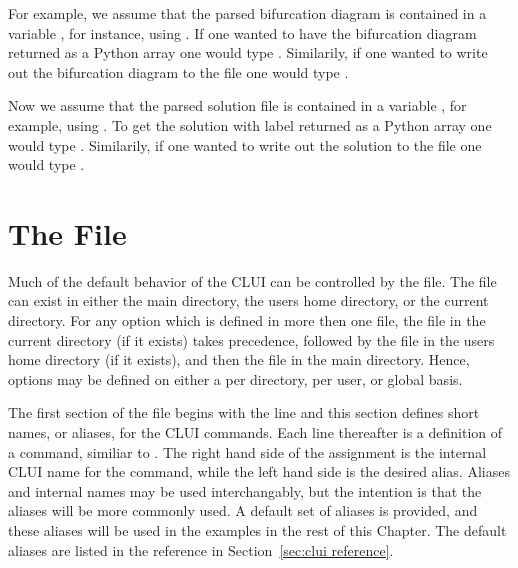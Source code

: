 \documentclass[12pt]{report}
\begin{document}
 For example, we assume
 that the parsed bifurcation diagram is contained in a variable
 , for instance, using .  If
 one wanted to have the bifurcation diagram returned as a Python array
 one would type .  Similarily, if one wanted
 to write out the bifurcation diagram to the file 
 one would type .

 Now we assume that the parsed solution file is contained
 in a variable , for example, using .
 To get the solution with label  returned as a Python
 array one would type .
 Similarily, if one wanted to write out the solution
 to the file  one would type
 .

 \section{ The  File }

 Much of the default behavior of the \AUTO CLUI
 can be controlled by the  file.
 The  file can exist in
 either the main \AUTO directory, the users
 home directory, or the current directory.  For any
 option which is defined in more then one file, 
 the  file
 in the current directory (if it exists) takes precedence, 
 followed by the  file
 in the users home directory (if it exists), and then the
  file in the main \AUTO directory.  Hence, 
 options may be defined on either a per directory, per
 user, or global basis.  

 The first section of the  file
 begins with the line 
 and this section defines short names, or aliases,
 for the \AUTO CLUI commands.  
 Each line thereafter is a definition of
 a command, similiar to 
 .
 The right hand side of the assignment
 is the internal \AUTO CLUI name for the command,
 while the left hand side is the desired alias.  
 Aliases and
 internal names may be used interchangably, but the
 intention is that the aliases will be more commonly
 used.  A default set of aliases is provided, and
 these aliases will be used in the examples in the
 rest of this Chapter.  The default aliases
 are listed in the reference in Section~\ref{sec:clui reference}.
\end{document}
